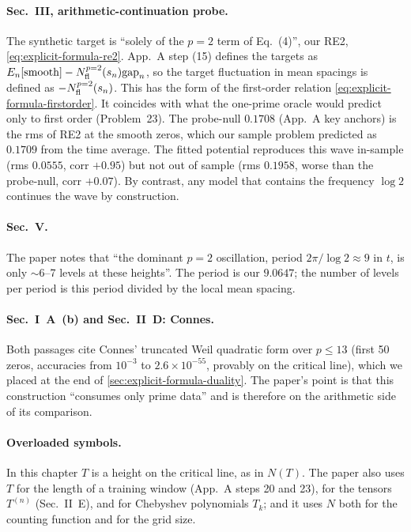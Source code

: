 \paragraph{Sec.~III, arithmetic-continuation probe.} The synthetic target is ``solely of the $p{=}2$ term of Eq.~(4)'', our RE2, \cref{eq:explicit-formula-re2}. App.~A step (15) defines the targets as $E_n[\text{smooth}]-N^{p=2}_{\rm fl}(s_n)\mathrm{gap}_n$, so the target fluctuation in mean spacings is defined as $-N^{p=2}_{\rm fl}(s_n)$. This has the form of the first-order relation \cref{eq:explicit-formula-firstorder}. It coincides with what the one-prime oracle would predict only to first order (Problem~23). The probe-null $0.1708$ (App.~A key anchors) is the rms of RE2 at the smooth zeros, which our sample problem predicted as $0.1709$ from the time average. The fitted potential reproduces this wave in-sample (rms $0.0555$, corr $+0.95$) but not out of sample (rms $0.1958$, worse than the probe-null, corr $+0.07$). By contrast, any model that contains the frequency $\log2$ continues the wave by construction.

\paragraph{Sec.~V.} The paper notes that ``the dominant $p{=}2$ oscillation, period $2\pi/\log2\approx9$ in $t$, is only $\sim$6--7 levels at these heights''. The period is our $9.0647$; the number of levels per period is this period divided by the local mean spacing.

\paragraph{Sec.~I~A~(b) and Sec.~II~D: Connes.} Both passages cite Connes' truncated Weil quadratic form over $p\le13$ (first 50 zeros, accuracies from $10^{-3}$ to $2.6\times10^{-55}$, provably on the critical line), which we placed at the end of \cref{sec:explicit-formula-duality}. The paper's point is that this construction ``consumes only prime data'' and is therefore on the arithmetic side of its comparison.

\paragraph{Overloaded symbols.} In this chapter $T$ is a height on the critical line, as in $N(T)$. The paper also uses $T$ for the length of a training window (App.~A steps 20 and 23), for the tensors $T^{(n)}$ (Sec.~II~E), and for Chebyshev polynomials $T_k$; and it uses $N$ both for the counting function and for the grid size.

